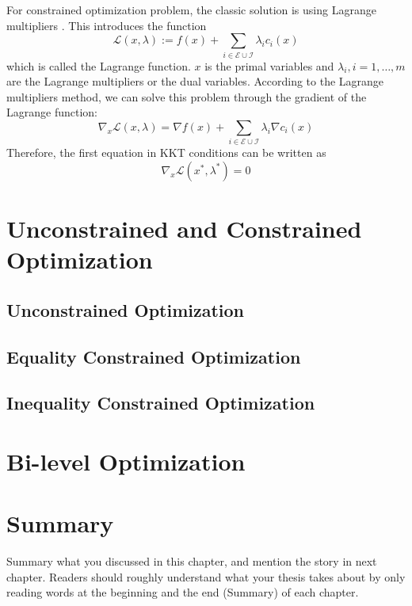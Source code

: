\par For constrained optimization problem, the classic solution is using Lagrange multipliers \cite{BD:14}. This introduces the function 
$$
\mathscr{L}(x, \lambda):=f(x)+\sum_{i \in \mathscr{E} \cup \mathscr{I}} \lambda_{i} c_{i}(x)
$$
which is called the Lagrange function. $x$ is the primal variables and $\lambda_i, i=1, \dots, m$ are the Lagrange multipliers or the dual variables. According to the Lagrange multipliers method, we can solve this problem through the gradient of the Lagrange function: 
$$
\nabla_{x} \mathscr{L}(x, \lambda)=\nabla f(x)+\sum_{i \in \mathscr{E} \cup \mathscr{I}} \lambda_{i} \nabla c_{i}(x)
$$
Therefore, the first equation in KKT conditions can be written as
$$
\nabla_{x} \mathscr{L}\left(x^{*}, \lambda^{*}\right)=0
$$



\section{Unconstrained and Constrained Optimization}
\label{sec:consopt}
\subsection{Unconstrained Optimization}
\subsection{Equality Constrained Optimization}
\subsection{Inequality Constrained Optimization}

\section{Bi-level Optimization}
\label{sec:bilevel}



\section{Summary}
\label{sec:2summary}
Summary what you discussed in this chapter, and mention the story in next
chapter. Readers should roughly understand what your thesis takes about by only reading
words at the beginning and the end (Summary) of each chapter.



